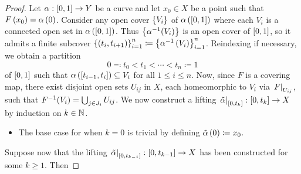 \documentclass[../Moduli_Spaces_of_Riemann_Surfaces.tex]{subfiles}
\begin{document}
    \begin{proof}
        Let $\alpha:\left[0,1\right]\to Y$ be a curve and let $x_0\in X$ be a point such that $F\left(x_0\right)=\alpha\left(0\right)$. Consider any open cover $\left\{V_i\right\}$ of $\alpha\left(\left[0,1\right]\right)$ where each $V_i$ is a connected open set in $\alpha\left(\left[0,1\right]\right)$. Thus $\left\{\alpha^{-1}\!\left(V_i\right)\right\}$ is an open cover of $\left[0,1\right]$, so it admits a finite subcover $\left\{\left(t_i,t_{i+1}\right)\right\}_{i=1}^n\coloneqq\left\{\alpha^{-1}\left(V_i\right)\right\}_{i=1}^n$. Reindexing if necessary, we obtain a partition
        \begin{equation*}
            0\eqqcolon t_0<t_1<\cdots<t_n\coloneqq1
        \end{equation*}
        of $\left[0,1\right]$ such that $\alpha\left(\left[t_{i-1},t_i\right]\right)\subseteq V_i$ for all $1\leq i\leq n$. Now, since $F$ is a covering map, there exist disjoint open sets $U_{ij}$ in $X$, each homeomorphic to $V_i$ via $\left.F\right|_{U_{ij}}$, such that $F^{-1}\!\left(V_i\right)=\bigcup_{j\in J_i}U_{ij}$. We now construct a lifting $\left.\tilde{\alpha}\right|_{\left[0,t_k\right]}:\left[0,t_k\right]\to X$ by induction on $k\in\mathbb{N}$.
        \begin{itemize}
            \item The base case for when $k=0$ is trivial by defining $\tilde{\alpha}\left(0\right)\coloneqq x_0$.
        \end{itemize}
        Suppose now that the lifting $\left.\tilde{\alpha}\right|_{\left[0,t_{k-1}\right]}:\left[0,t_{k-1}\right]\to X$ has been constructed for some $k\geq1$. Then
\end{proof}
\end{document}
